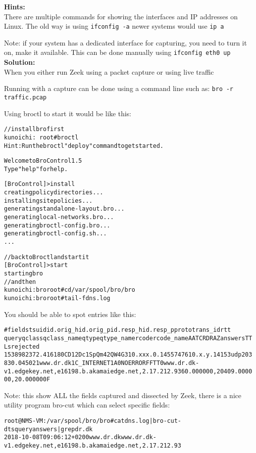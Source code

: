 \documentclass[a4paper,11pt,notitlepage]{report}
\begin{document}
{\bf Hints:}\\
There are multiple commands for showing the interfaces and IP addresses on Linux. The old way is using \verb+ifconfig -a+ newer systems would use \verb+ip a+

Note: if your system has a dedicated interface for capturing, you need to turn it on, make it available. This can be done manually using \verb+ifconfig eth0 up+
{\bf Solution:}\\
When you either run Zeek using a packet capture or using live traffic

Running with a capture can be done using a command line such as:
\verb+bro -r traffic.pcap+

Using broctl to start it would be like this:
\begin{alltt}\small
// install bro first
kunoichi:~ root# broctl
Hint: Run the broctl "deploy" command to get started.

Welcome to BroControl 1.5
Type "help" for help.

[BroControl] > install
creating policy directories ...
installing site policies ...
generating standalone-layout.bro ...
generating local-networks.bro ...
generating broctl-config.bro ...
generating broctl-config.sh ...
...
\end{alltt}

\begin{alltt}\small
// back to Broctl and start it
[BroControl] > start
starting bro
// and then
kunoichi:bro root# cd /var/spool/bro/bro
kunoichi:bro root# tail -f dns.log
\end{alltt}

You should be able to spot entries like this:
\begin{alltt}\small
#fields ts      uid     id.orig_h       id.orig_p       id.resp_h       id.resp_p       proto   trans_id        rtt
     query   qclass  qclass_name     qtype   qtype_name      rcode   rcode_name      AA      TC      RD      RA      Z       answers TTLs    rejected
1538982372.416180	CD12Dc1SpQm42QW4G3	10.xxx.0.145	57476	10.x.y.141	53	udp	20383	0.045021	www.dr.dk	1	C_INTERNET	1	A	0	NOERROR	F	F	T	T	0	www.dr.dk-v1.edgekey.net,e16198.b.akamaiedge.net,2.17.212.93	60.000000,20409.000000,20.000000	F
\end{alltt}

Note: this show ALL the fields captured and dissected by Zeek, there is a nice utility program bro-cut which can select specific fields:

\begin{alltt}\small
root@NMS-VM:/var/spool/bro/bro# cat dns.log | bro-cut -d ts query answers | grep dr.dk
2018-10-08T09:06:12+0200	www.dr.dk	www.dr.dk-v1.edgekey.net,e16198.b.akamaiedge.net,2.17.212.93
\end{alltt}
\end{document}
